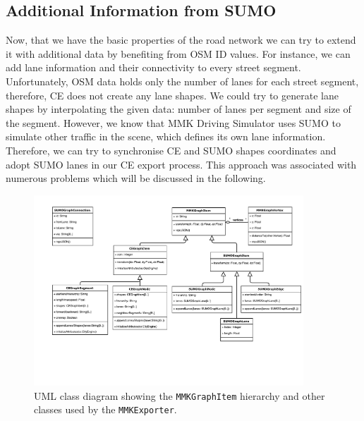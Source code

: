 \subsection{Additional Information from SUMO}

Now, that we have the basic properties of the road network we can try to extend it with additional data by benefiting from OSM ID values. For instance, we can add lane information and their connectivity to every street segment. Unfortunately, OSM data holds only the number of lanes for each street segment, therefore, CE does not create any lane shapes. We could try to generate lane shapes by interpolating the given data: number of lanes per segment and size of the segment. However, we know that MMK Driving Simulator uses SUMO to simulate other traffic in the scene, which defines its own lane information. Therefore, we can try to synchronise CE and SUMO shapes coordinates and adopt SUMO lanes in our CE export process. This approach was associated with numerous problems which will be discussed in the following.

\begin{figure}[htb]
	\centering
	\includegraphics[width=0.9\textwidth]{figures/ce-uml}
	\caption{UML class diagram showing the \texttt{MMKGraphItem} hierarchy and other classes used by the \texttt{MMKExporter}.}
	\label{fig:ce-uml}
\end{figure}

